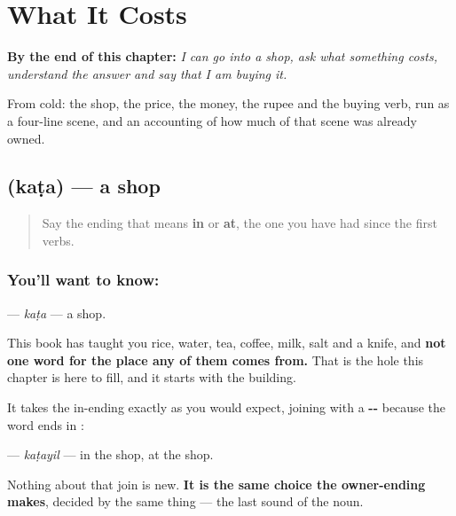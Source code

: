 
\chapter{What It Costs}
\label{ch:ml-shopping}

\begin{chapteropening}
\textbf{By the end of this chapter:} \emph{I can go into a shop, ask what something costs, understand the answer and say that I am buying it.}

From cold: the shop, the price, the money, the rupee and the buying verb, run as a four-line scene, and an accounting of how much of that scene was already owned.
\end{chapteropening}

\section[\texorpdfstring{\ml{കട} (kaṭa)}{കട (kaṭa)}]{ (kaṭa) — a shop}

\label{lesson:ML-C91-kada}



\begin{quote}
Say the ending that means \textbf{in} or \textbf{at}, the one you have had since the first verbs.
\end{quote}

\subsection*{You'll want to know: }
\textbf{} — \emph{kaṭa} — a shop.

This book has taught you rice, water, tea, coffee, milk, salt and a knife, and \textbf{not one word for the place any of them comes from.} That is the hole this chapter is here to fill, and it starts with the building.

It takes the in-ending exactly as you would expect, joining with a \textbf{--} because the word ends in \textbf{}:

\textbf{} — \emph{kaṭayil} — in the shop, at the shop.

Nothing about that join is new. \textbf{It is the same choice the owner-ending makes}, decided by the same thing — the last sound of the noun.


